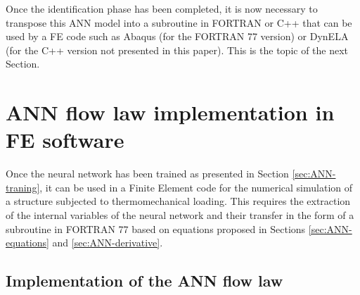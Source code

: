 \documentclass[algorithms,article,submit,pdftex,moreauthors]{Definitions/mdpi}
\begin{document}
Once the identification phase has been completed, it is now necessary to transpose this ANN model into a subroutine in FORTRAN or C++ that can be used by a FE code such as Abaqus (for the FORTRAN 77 version) or DynELA (for the C++ version not presented in this paper).
This is the topic of the next Section.

\section{ANN flow law implementation in FE software}\label{sec:Use}

Once the neural network has been trained as presented in Section \ref{sec:ANN-traning}, it can be used in a Finite Element code for the numerical simulation of a structure subjected to thermomechanical loading.
This requires the extraction of the internal variables of the neural network and their transfer in the form of a subroutine in FORTRAN 77 based on equations proposed in Sections \ref{sec:ANN-equations} and \ref{sec:ANN-derivative}.

\subsection{Implementation of the ANN flow law}\label{sec:Implementation}
\end{document}
